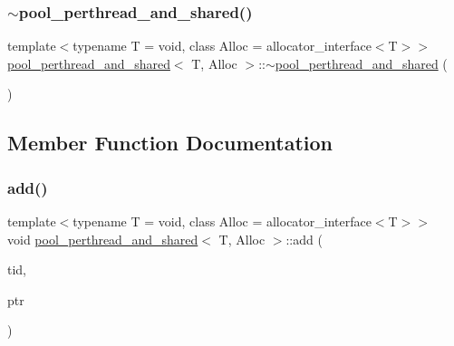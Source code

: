 \subsubsection{\texorpdfstring{$\sim$pool\+\_\+perthread\+\_\+and\+\_\+shared()}{~pool\_perthread\_and\_shared()}}
{\footnotesize\ttfamily template$<$typename T  = void, class Alloc  = allocator\+\_\+interface$<$\+T$>$$>$ \\
\hyperlink{classpool__perthread__and__shared}{pool\+\_\+perthread\+\_\+and\+\_\+shared}$<$ T, Alloc $>$\+::$\sim$\hyperlink{classpool__perthread__and__shared}{pool\+\_\+perthread\+\_\+and\+\_\+shared} (\begin{DoxyParamCaption}{ }\end{DoxyParamCaption})\hspace{0.3cm}{\ttfamily [inline]}}



\subsection{Member Function Documentation}
\mbox{\label{classpool__perthread__and__shared_a578633fa1ef9648a47451441abaaf2fe}} 
\subsubsection{\texorpdfstring{add()}{add()}}
{\footnotesize\ttfamily template$<$typename T  = void, class Alloc  = allocator\+\_\+interface$<$\+T$>$$>$ \\
void \hyperlink{classpool__perthread__and__shared}{pool\+\_\+perthread\+\_\+and\+\_\+shared}$<$ T, Alloc $>$\+::add (\begin{DoxyParamCaption}\item[{const int}]{tid,  }\item[{T $\ast$}]{ptr }\end{DoxyParamCaption})\hspace{0.3cm}{\ttfamily [inline]}}

\mbox{\label{classpool__perthread__and__shared_a3337f390a8739b621271a54c1233c470}} 
